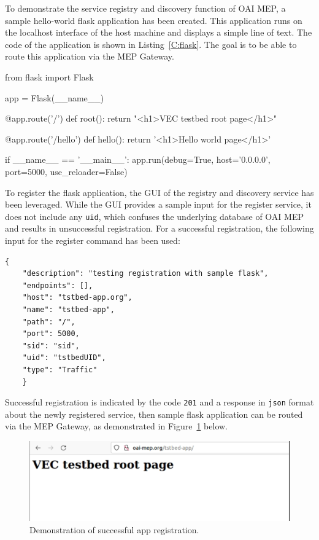\documentclass[12pt,a4paper,twoside]{report}
\begin{document}
To demonstrate the service registry and discovery function of OAI MEP, a sample hello-world flask application has been created. This application runs on the localhost interface of the host machine and displays a simple line of text. The code of the application is shown in Listing~\ref{C:flask}. The goal is to be able to route this application via the MEP Gateway.

\begin{flask}[caption={Sample flask app in python}, label={C:flask}]
	from flask import Flask

	app = Flask(__name__)

	@app.route('/')
	def root():
		return "<h1>VEC testbed root page</h1>"

	@app.route('/hello')
	def hello():
		return '<h1>Hello world page</h1>'

	if __name__ == '__main__':
		app.run(debug=True, host='0.0.0.0', port=5000, use_reloader=False)
\end{flask}

To register the flask application, the GUI of the registry and discovery service has been leveraged. While the GUI provides a sample input for the register service, it does not include any \verb|uid|, which confuses the underlying database of OAI MEP and results in unsuccessful registration. For a successful registration, the following input for the register command has been used:
%

\begin{verbatim}
{
	"description": "testing registration with sample flask",
	"endpoints": [],
	"host": "tstbed-app.org",
	"name": "tstbed-app",
	"path": "/",
	"port": 5000,
	"sid": "sid",
	"uid": "tstbedUID",
	"type": "Traffic"
	}
\end{verbatim}
Successful registration is indicated by the code \verb|201| and a response in \verb|json| format about the newly registered service, then sample flask application can be routed via the MEP Gateway, as demonstrated in Figure~\ref{F:flask-hello-demo} below.
%
\begin{figure}[!ht]
	\centering
	\includegraphics[width=13cm]{./images/flask-demo.png} 
	\caption{Demonstration of successful app registration.}
	\label{F:flask-hello-demo}
\end{figure}
\end{document}

